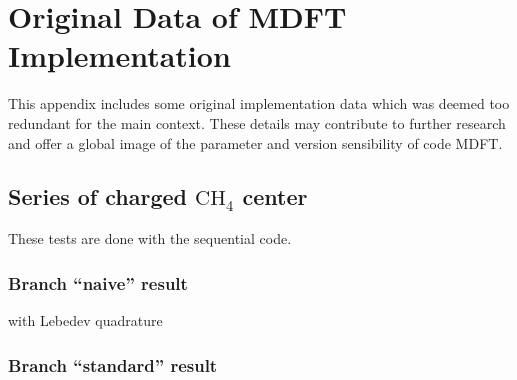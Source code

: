 
\chapter{Original Data of MDFT Implementation\label{chpt:original_data}}

This appendix includes some original implementation data which was deemed
too redundant for the main context. These details may
contribute to further research and offer a global image of the
parameter and version sensibility of code MDFT.

\section{Series of charged $\mathrm{C}\mathrm{H}_{4}$ center}

These tests are done with the sequential code.

\subsection{Branch ``naive'' result}

with Lebedev quadrature

\subsection{Branch ``standard'' result}
